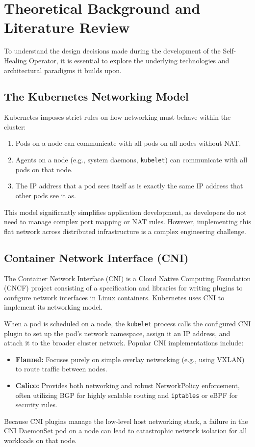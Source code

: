 \documentclass[12pt,a4paper]{article}
\begin{document}
\newpage

\section{Theoretical Background and Literature Review}
\onehalfspacing
To understand the design decisions made during the development of the Self-Healing Operator, it is essential to explore the underlying technologies and architectural paradigms it builds upon.

\subsection{The Kubernetes Networking Model}
Kubernetes imposes strict rules on how networking must behave within the cluster:
\begin{enumerate}
    \item Pods on a node can communicate with all pods on all nodes without NAT.
    \item Agents on a node (e.g., system daemons, \texttt{kubelet}) can communicate with all pods on that node.
    \item The IP address that a pod sees itself as is exactly the same IP address that other pods see it as.
\end{enumerate}
This model significantly simplifies application development, as developers do not need to manage complex port mapping or NAT rules. However, implementing this flat network across distributed infrastructure is a complex engineering challenge.

\subsection{Container Network Interface (CNI)}
The Container Network Interface (CNI) is a Cloud Native Computing Foundation (CNCF) project consisting of a specification and libraries for writing plugins to configure network interfaces in Linux containers. Kubernetes uses CNI to implement its networking model. 

When a pod is scheduled on a node, the \texttt{kubelet} process calls the configured CNI plugin to set up the pod's network namespace, assign it an IP address, and attach it to the broader cluster network. Popular CNI implementations include:
\begin{itemize}
    \item \textbf{Flannel:} Focuses purely on simple overlay networking (e.g., using VXLAN) to route traffic between nodes.
    \item \textbf{Calico:} Provides both networking and robust NetworkPolicy enforcement, often utilizing BGP for highly scalable routing and \texttt{iptables} or eBPF for security rules.
\end{itemize}
Because CNI plugins manage the low-level host networking stack, a failure in the CNI DaemonSet pod on a node can lead to catastrophic network isolation for all workloads on that node.
\end{document}
